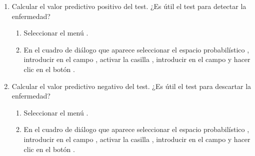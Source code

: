 \begin{enumerate}[leftmargin=*]
\begin{enumerate}
\item Calcular el valor predictivo positivo del test. 
¿Es útil el test para detectar la enfermedad? 
\begin{indicacion}
\begin{enumerate}
\item Seleccionar el menú .
\item En el cuadro de diálogo que aparece seleccionar el espacio probabilístico , introducir
 en el campo , activar la casilla , introducir
 en el campo  y hacer clic en el botón .
\end{enumerate}
\end{indicacion} 

\item Calcular el valor predictivo negativo del test.
¿Es útil el test para descartar la enfermedad?
\begin{indicacion}
\begin{enumerate}
\item Seleccionar el menú .
\item En el cuadro de diálogo que aparece seleccionar el espacio probabilístico , introducir
 en el campo , activar la casilla , introducir
 en el campo  y hacer clic en el botón .
\end{enumerate}
\end{indicacion} 
\end{enumerate} 

\end{enumerate}


